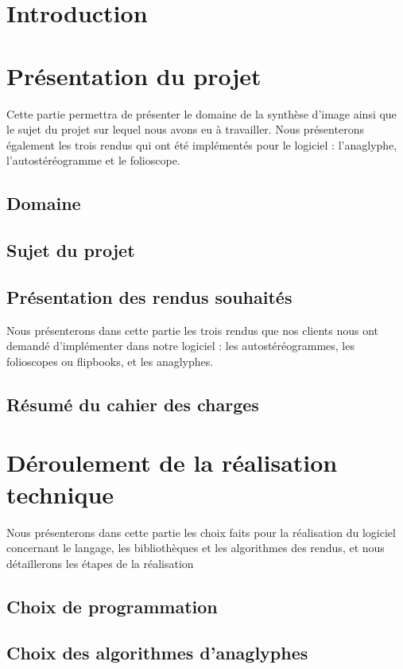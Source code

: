 \documentclass[paper=a4, fontsize=12pt]{article}
\newenvironment{changemargin}[2]{\begin{list}{}{%
      \setlength{\topsep}{0pt}%
      \setlength{\leftmargin}{0pt}%
      \setlength{\rightmargin}{0pt}%
      \setlength{\listparindent}{\parindent}%
      \setlength{\itemindent}{\parindent}%
      \setlength{\parsep}{0pt plus 1pt}%
      \addtolength{\leftmargin}{#1}%
      \addtolength{\rightmargin}{#2}%
    }\item }{\end{list}}
\numberwithin{equation}{section}		%
\numberwithin{figure}{section}			%
\numberwithin{table}{section}				%
\begin{document}
\begin{changemargin}{-1cm}{-1cm}

  \section{Introduction}
  
  \newpage

  \section{Présentation du projet}
  Cette partie permettra de présenter le domaine de la synthèse d'image ainsi que le sujet du projet sur lequel nous avons eu à travailler. Nous présenterons également les trois rendus qui ont été implémentés pour le logiciel : l'anaglyphe, l'autostéréogramme et le folioscope.
  \subsection{Domaine}
  
  \subsection{Sujet du projet}
  
  \subsection{Présentation des rendus souhaités}
  Nous présenterons dans cette partie les trois rendus que nos clients nous ont demandé d'implémenter dans notre logiciel : les autostéréogrammes, les folioscopes ou flipbooks, et les anaglyphes.
  
  \subsection{Résumé du cahier des charges}
  
  \newpage


  \section{Déroulement de la réalisation technique}
  Nous présenterons dans cette partie les choix faits pour la réalisation du logiciel concernant le langage, les bibliothèques et les algorithmes des rendus, et nous détaillerons les étapes de la réalisation
  \subsection{Choix de programmation}
  
  \subsection{Choix des algorithmes d'anaglyphes}
  

\end{changemargin}
\end{document}
